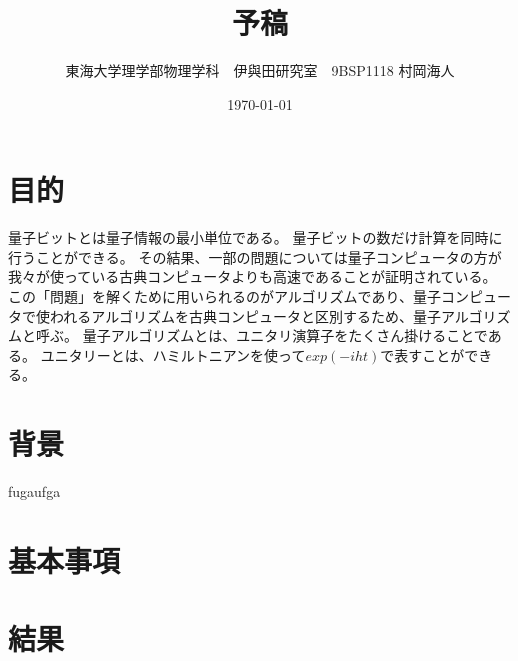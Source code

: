 \documentclass[platex,dvipdfmx, twocolumn]{jlreq}			%
\title{予稿}
\author{東海大学理学部物理学科　伊與田研究室　9BSP1118 村岡海人}
\date{\today}
\begin{document}
\maketitle
\section{目的}
量子ビットとは量子情報の最小単位である。
量子ビットの数だけ計算を同時に行うことができる。
その結果、一部の問題については量子コンピュータの方が我々が使っている古典コンピュータよりも高速であることが証明されている。
この「問題」を解くために用いられるのがアルゴリズムであり、量子コンピュータで使われるアルゴリズムを古典コンピュータと区別するため、量子アルゴリズムと呼ぶ。
量子アルゴリズムとは、ユニタリ演算子をたくさん掛けることである。
ユニタリーとは、ハミルトニアンを使って$exp(-iht)$で表すことができる。

\section{背景}
fugaufga

\section{基本事項}

\section{結果}
\end{document}
